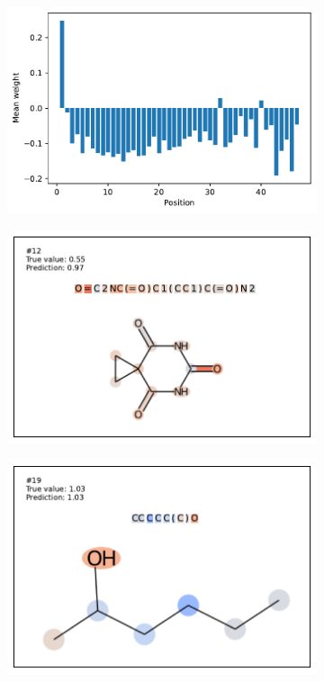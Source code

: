\documentclass{article} %
\begin{document}
\begin{figure}[h]
    \centering
    \begin{subfigure}[b]{0.49\textwidth}\label{fig:esol-stats}
      \centering 
      \includegraphics[width=\textwidth]{figures/esol-stats.pdf} 
    \end{subfigure}\begin{subfigure}[b]{0.49\textwidth}\label{fig:esol12}
      \centering 
      \includegraphics[width=\textwidth]{figures/esol/esol12.pdf} 
    \end{subfigure}
    \begin{subfigure}[b]{0.49\textwidth}\label{fig:esol19}
      \centering 
      \includegraphics[width=\textwidth]{figures/esol/esol19.pdf} 

\end{subfigure}
\end{figure}
\end{document}
